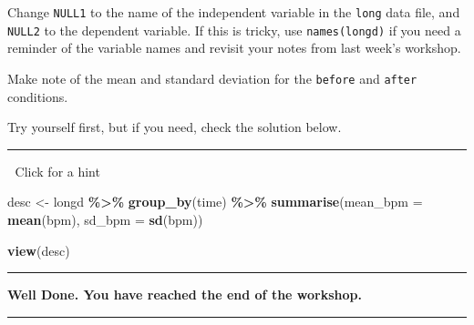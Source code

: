 \documentclass[
]{book}
\newenvironment{Shaded}{\begin{snugshade}}{\end{snugshade}}
\newcommand{\AttributeTok}[1]{\textcolor[rgb]{0.13,0.29,0.53}{#1}}
\newcommand{\FunctionTok}[1]{\textcolor[rgb]{0.13,0.29,0.53}{\textbf{#1}}}
\newcommand{\NormalTok}[1]{#1}
\newcommand{\OtherTok}[1]{\textcolor[rgb]{0.56,0.35,0.01}{#1}}
\newcommand{\SpecialCharTok}[1]{\textcolor[rgb]{0.81,0.36,0.00}{\textbf{#1}}}
\begin{document}
Change \texttt{NULL1} to the name of the independent variable in the \texttt{long} data file, and \texttt{NULL2} to the dependent variable. If this is tricky, use \texttt{names(longd)} if you need a reminder of the variable names and revisit your notes from last week's workshop.

Make note of the mean and standard deviation for the \texttt{before} and \texttt{after} conditions.

Try yourself first, but if you need, check the solution below.

\begin{center}\rule{0.5\linewidth}{0.5pt}\end{center}

👀 Click for a hint

\begin{Shaded}
\begin{Highlighting}[]
\NormalTok{desc }\OtherTok{\textless{}{-}}\NormalTok{ longd }\SpecialCharTok{\%\textgreater{}\%}
  \FunctionTok{group\_by}\NormalTok{(time) }\SpecialCharTok{\%\textgreater{}\%}
  \FunctionTok{summarise}\NormalTok{(}\AttributeTok{mean\_bpm =} \FunctionTok{mean}\NormalTok{(bpm),}
            \AttributeTok{sd\_bpm =} \FunctionTok{sd}\NormalTok{(bpm))}

\FunctionTok{view}\NormalTok{(desc)}
\end{Highlighting}
\end{Shaded}

\begin{center}\rule{0.5\linewidth}{0.5pt}\end{center}

\textbf{Well Done. You have reached the end of the workshop.}

\begin{center}\rule{0.5\linewidth}{0.5pt}\end{center}


\end{document}
